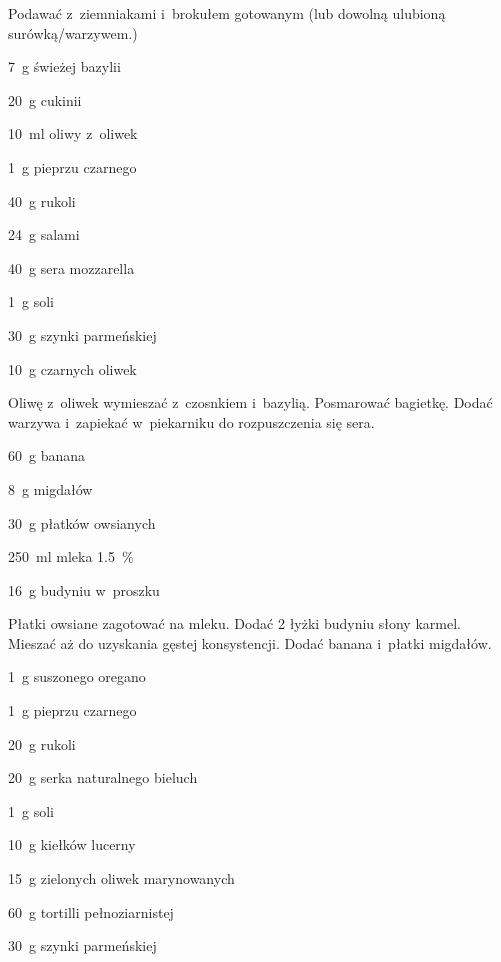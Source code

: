 \documentclass[../kucharek.tex]{subfiles}
\begin{document}
Podawać z~ziemniakami i~brokułem gotowanym (lub dowolną ulubioną
surówką/warzywem.)


\begin{Ingred}
    \item \qty{7}{\gram} świeżej bazylii
    \item \qty{20}{\gram} cukinii
    \item \qty{10}{\milli\litre} oliwy z~oliwek
    \item \qty{1}{\gram} pieprzu czarnego
    \item \qty{40}{\gram} rukoli
    \item \qty{24}{\gram} salami
    \item \qty{40}{\gram} sera mozzarella
    \item \qty{1}{\gram} soli
    \item \qty{30}{\gram} szynki parmeńskiej
    \item \qty{10}{\gram} czarnych oliwek
\end{Ingred}

Oliwę z~oliwek wymieszać z~czosnkiem i~bazylią. Posmarować bagietkę. Dodać
warzywa i~zapiekać w~piekarniku do rozpuszczenia się sera.


\begin{Ingred}
    \item \qty{60}{\gram} banana
    \item \qty{8}{\gram} migdałów
    \item \qty{30}{\gram} płatków owsianych
    \item \qty{250}{\milli\litre} mleka \qty{1.5}{\percent}
    \item \qty{16}{\gram} budyniu w~proszku
\end{Ingred}

Płatki owsiane zagotować na mleku. Dodać \num{2} łyżki budyniu słony karmel.
Mieszać aż do uzyskania gęstej konsystencji. Dodać banana i~płatki migdałów.


\begin{Ingred}
    \item \qty{1}{\gram} suszonego oregano
    \item \qty{1}{\gram} pieprzu czarnego
    \item \qty{20}{\gram} rukoli
    \item \qty{20}{\gram} serka naturalnego bieluch
    \item \qty{1}{\gram} soli
    \item \qty{10}{\gram} kiełków lucerny
    \item \qty{15}{\gram} zielonych oliwek marynowanych
    \item \qty{60}{\gram} tortilli pełnoziarnistej
    \item \qty{30}{\gram} szynki parmeńskiej
\end{Ingred}
\end{document}
